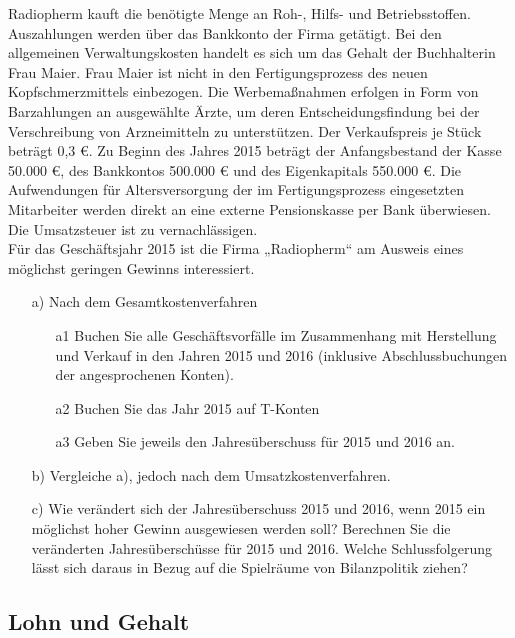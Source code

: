 \documentclass[paper=a4, fontsize=11pt]{scrartcl}
\numberwithin{equation}{section}
\numberwithin{figure}{section}
\numberwithin{table}{section}
\begin{document}
Radiopherm kauft die benötigte Menge an Roh-, Hilfs- und Betriebsstoffen. Auszahlungen werden über das Bankkonto der Firma getätigt. Bei den allgemeinen Verwaltungskosten handelt es sich um das Gehalt der Buchhalterin Frau Maier. Frau Maier ist nicht in den Fertigungsprozess des neuen Kopfschmerzmittels einbezogen. Die Werbemaßnahmen erfolgen in Form von Barzahlungen an ausgewählte Ärzte, um deren Entscheidungsfindung bei der Verschreibung von Arzneimitteln zu unterstützen. Der Verkaufspreis je Stück beträgt 0,3 €. Zu Beginn des Jahres 2015 beträgt der Anfangsbestand der Kasse 50.000 €, des Bankkontos 500.000 € und des Eigenkapitals 550.000 €. Die Aufwendungen für Altersversorgung der im Fertigungsprozess eingesetzten Mitarbeiter werden direkt an eine externe Pensionskasse per Bank überwiesen. Die Umsatzsteuer ist zu vernachlässigen. \\
Für das Geschäftsjahr 2015 ist die Firma „Radiopherm“ am Ausweis eines möglichst geringen Gewinns interessiert. \\
\begin{itemize}
\item[a)] Nach dem Gesamtkostenverfahren 
\begin{itemize}
\item[a1] Buchen Sie alle Geschäftsvorfälle im Zusammenhang mit Herstellung und Verkauf in den Jahren 2015 und 2016 (inklusive Abschlussbuchungen der angesprochenen Konten).
\item[a2] Buchen Sie das Jahr 2015 auf T-Konten
\item[a3] Geben Sie jeweils den Jahresüberschuss für 2015 und 2016 an.
\end{itemize}
\item[b)] Vergleiche a), jedoch nach dem Umsatzkostenverfahren.
\item[c)] Wie verändert sich der Jahresüberschuss 2015 und 2016, wenn 2015 ein möglichst hoher Gewinn ausgewiesen werden soll? Berechnen Sie die veränderten Jahresüberschüsse für 2015 und 2016. Welche Schlussfolgerung lässt sich daraus in Bezug auf die Spielräume von Bilanzpolitik ziehen? 
\end{itemize}
\subsection{Lohn und Gehalt}
\end{document}
